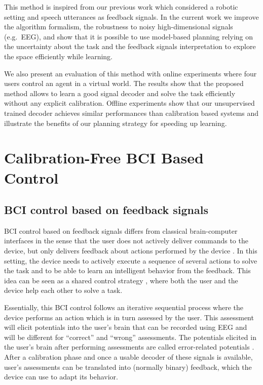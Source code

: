 \documentclass[letterpaper]{article}
\begin{document}
This method is inspired from our previous work \cite{grizou2013robot} which considered a robotic setting and speech utterances as feedback signals. In the current work we improve the algorithm formalism, the robustness to noisy high-dimensional signals (e.g.\ EEG), and show that it is possible to use model-based planning relying on the uncertainty about the task and the feedback signals interpretation to explore the space efficiently while learning.

We also present an evaluation of this method with online experiments where four users control an agent in a virtual world. The results show that the proposed method allows to learn a good signal decoder and solve the task efficiently without any explicit calibration. Offline experiments show that our unsupervised trained decoder achieves similar performances than calibration based systems and illustrate the benefits of our planning strategy for speeding up learning.

\section{Calibration-Free BCI Based Control}

\subsection{BCI control based on feedback signals}

BCI control based on feedback signals differs from classical brain-computer interfaces in the sense that the user does not actively deliver commands to the device, but only delivers feedback about actions performed by the device \cite{chavarriaga2010learning,iturrate13}. In this setting, the device needs to actively execute a sequence of several actions to solve the task and to be able to learn an intelligent behavior from the feedback. This idea can be seen as a shared control strategy \cite{millan2010combining}, where both the user and the device help each other to solve a task.

Essentially, this BCI control follows an iterative sequential process where the device performs an action which is in turn assessed by the user. This assessment will elicit potentials into the user's brain that can be recorded using EEG and will be different for ``correct'' and ``wrong'' assessments. The potentials elicited in the user's brain after performing assessments are called error-related potentials \cite{FerrezErrores}. After a calibration phase and once a usable decoder of these signals is available, user's assessments can be translated into (normally binary) feedback, which the device can use to adapt its behavior. 
\end{document}
